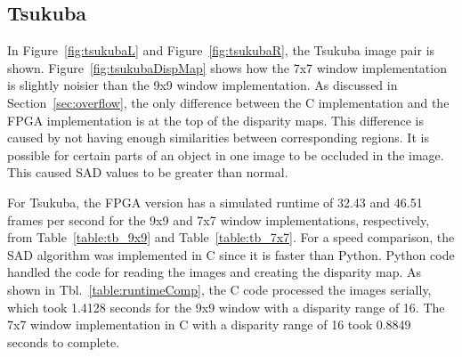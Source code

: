 \subsection{Tsukuba}
\label{sec:tsukuba}

In Figure~\ref{fig:tsukubaL} and Figure~\ref{fig:tsukubaR}, the Tsukuba image pair is shown. Figure~\ref{fig:tsukubaDispMap} shows how the 7x7 window implementation is slightly noisier than the 9x9 window implementation. As discussed in Section~\ref{sec:overflow}, the only difference between the C implementation and the FPGA implementation is at the top of the disparity maps. This difference is caused by not having enough similarities between corresponding regions. It is possible for certain parts of an object in one image to be occluded in the image. This caused SAD values to be greater than normal. 

For Tsukuba, the FPGA version has a simulated runtime of 32.43 and 46.51 frames per second for the 9x9 and 7x7 window implementations, respectively, from Table~\ref{table:tb_9x9} and Table~\ref{table:tb_7x7}. For a speed comparison, the SAD algorithm was implemented in C since it is faster than Python. Python code handled the code for reading the images and creating the disparity map. As shown in Tbl.~\ref{table:runtimeComp}, the C code processed the images serially, which took 1.4128 seconds for the 9x9 window with a disparity range of 16. The 7x7 window implementation in C with a disparity range of 16 took 0.8849 seconds to complete.

